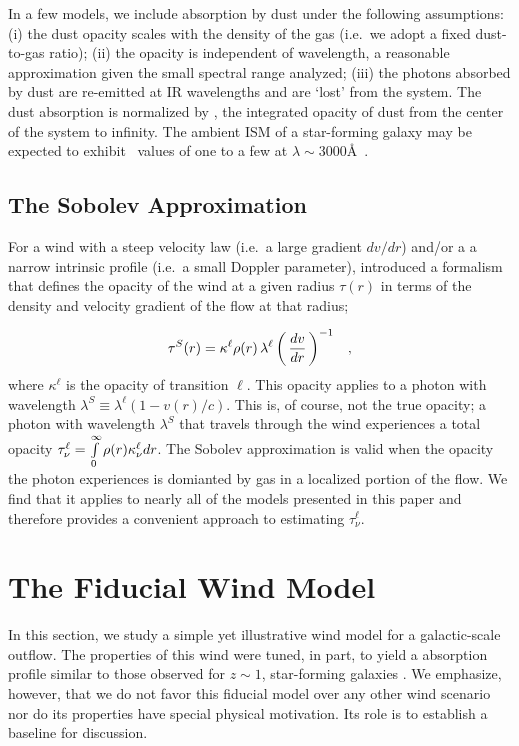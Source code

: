 \documentclass[12pt,preprint]{aastex}
\begin{document}
In a few models, we include absorption by dust under the following
assumptions:
(i) the dust opacity scales with the density of the gas (i.e.\ we
adopt a fixed dust-to-gas ratio);
(ii) the opacity is independent of wavelength, a reasonable
approximation given the small spectral range analyzed;
(iii) the photons absorbed by dust are re-emitted at IR wavelengths
and are `lost' from the system.  The dust absorption is normalized by \taud, 
the integrated opacity of dust from the center of the system to
infinity.  The ambient ISM of a star-forming galaxy may be expected to exhibit
\taud\ values of one to a few at $\lambda \sim 3000$\AA\ \citep[e.g.][]{dust_again}.

\subsection{The Sobolev Approximation}

For a wind with a steep velocity law (i.e.\ a large gradient $dv/dr$)
and/or a a narrow intrinsic profile (i.e.\ a small Doppler parameter),
\citet{sobolev60} introduced a formalism that defines the opacity of
the wind at a given radius $\tau(r)$ in terms of the density and
velocity gradient of the flow at that radius;

\begin{equation}
\tau^S(r) = \kappa^\ell \rho(r) \, \lambda^\ell \left ( \, \frac{dv}{dr} 
\, \right )^{-1}  \;\;\; ,
\label{eqn:Sobolev}
\end{equation}
where $\kappa^\ell$ is the opacity of transition $\ell$.  This opacity
applies to a photon with wavelength $\lambda^S
\equiv \lambda^\ell (1-v(r)/c)$.
This is, of course, not the true opacity;
a photon with wavelength $\lambda^S$ that travels through the wind 
experiences a total opacity 
$\tau_\nu^\ell = \int\limits_0^\infty \rho(r) \kappa_\nu^\ell dr$.  The Sobolev
approximation is valid when the opacity the photon experiences is
domianted by gas in a localized portion of the flow.
We find that it applies to nearly all of the
models presented in this paper and therefore provides a convenient
approach to estimating $\tau^\ell_\nu$.



\section{The Fiducial Wind Model}
\label{sec:fiducial}

In this section, we study a simple yet illustrative wind model for
a galactic-scale outflow.  The properties of this wind were tuned, in
part, to yield a  absorption profile 
similar to those observed for $z \sim 1$, star-forming galaxies
\citep{wcp+09,rubin+10c}.  We emphasize, however, that we do not
favor this fiducial model over any other wind scenario nor do its
properties have special physical motivation.
Its role is to establish a baseline
for discussion.
\end{document}
